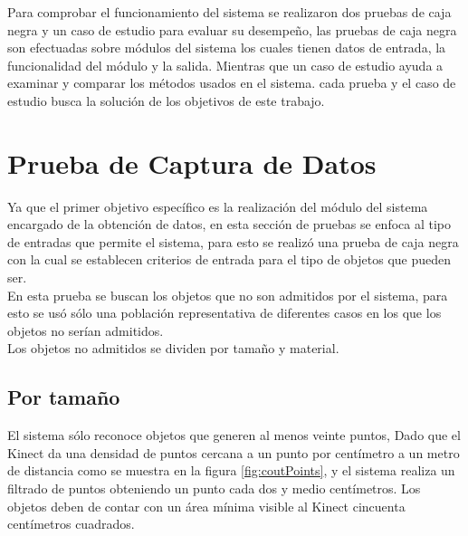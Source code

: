 




Para comprobar el funcionamiento del sistema se realizaron dos pruebas de caja negra y un caso de estudio para evaluar su desempeño, las pruebas de caja negra son efectuadas sobre módulos del sistema los cuales tienen datos de entrada, la funcionalidad del módulo y la salida. Mientras que un caso de estudio ayuda a examinar y comparar los métodos usados en el sistema. cada prueba y el caso de estudio busca la solución de los objetivos de este trabajo.

\section{Prueba de Captura de Datos}

	Ya que el primer objetivo específico es la realización del módulo del sistema encargado de la obtención de datos, en esta sección de pruebas se enfoca al tipo de entradas que permite el sistema, para esto se realizó una prueba de caja negra con la cual se establecen criterios de entrada para el tipo de objetos que pueden ser.\\
	
	En esta prueba se buscan los objetos que no son admitidos por el sistema, para esto se usó sólo una población representativa de diferentes casos en los que los objetos no serían admitidos.\\
	
	Los objetos no admitidos se dividen por tamaño y material.\\
	
	 \subsection{Por tamaño}
	
	 El sistema sólo reconoce objetos que generen al menos veinte puntos, Dado que el Kinect da una densidad de puntos cercana a un punto por centímetro a un metro de distancia como se muestra en la figura \ref{fig:coutPoints}, y el sistema realiza un filtrado de puntos obteniendo un punto cada dos y medio centímetros. Los objetos deben de contar con un área mínima visible al Kinect cincuenta centímetros cuadrados.\\
	 
